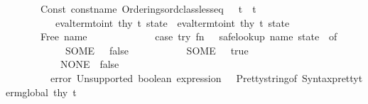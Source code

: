 \begin{isabellebody}
\ \ \ \ \ \ {\isacharbar}{\kern0pt}\ Const\ {\isacharparenleft}{\kern0pt}{\isacharat}{\kern0pt}{\isacharbraceleft}{\kern0pt}const{\isacharunderscore}{\kern0pt}name\ {\isachardoublequote}{\kern0pt}Orderings{\isachardot}{\kern0pt}ord{\isacharunderscore}{\kern0pt}class{\isachardot}{\kern0pt}less{\isacharunderscore}{\kern0pt}eq{\isachardoublequote}{\kern0pt}{\isacharbraceright}{\kern0pt}{\isacharcomma}{\kern0pt}\ {\isacharunderscore}{\kern0pt}{\isacharparenright}{\kern0pt}\ {\isachardollar}{\kern0pt}\ t{}\ {\isachardollar}{\kern0pt}\ t{}\ {\isacharequal}{\kern0pt}{\isachargreater}{\kern0pt}\isanewline
\ \ \ \ \ \ \ \ \ \ {\isacharparenleft}{\kern0pt}eval{\isacharunderscore}{\kern0pt}term{\isacharunderscore}{\kern0pt}to{\isacharunderscore}{\kern0pt}int\ thy\ t{}\ state{\isacharparenright}{\kern0pt}\ {\isacharless}{\kern0pt}{\isacharequal}{\kern0pt}\ {\isacharparenleft}{\kern0pt}eval{\isacharunderscore}{\kern0pt}term{\isacharunderscore}{\kern0pt}to{\isacharunderscore}{\kern0pt}int\ thy\ t{}\ state{\isacharparenright}{\kern0pt}\isanewline
\ \ \ \ \ \ {\isacharbar}{\kern0pt}\ Free\ {\isacharparenleft}{\kern0pt}name{\isacharcomma}{\kern0pt}\ {\isacharunderscore}{\kern0pt}{\isacharparenright}{\kern0pt}\ {\isacharequal}{\kern0pt}{\isachargreater}{\kern0pt}\ \isanewline
\ \ \ \ \ \ \ \ \ \ {\isacharparenleft}{\kern0pt}case\ try\ {\isacharparenleft}{\kern0pt}fn\ {\isacharparenleft}{\kern0pt}{\isacharparenright}{\kern0pt}\ {\isacharequal}{\kern0pt}{\isachargreater}{\kern0pt}\ safe{\isacharunderscore}{\kern0pt}lookup\ name\ state{\isacharparenright}{\kern0pt}\ {\isacharparenleft}{\kern0pt}{\isacharparenright}{\kern0pt}\ of\isanewline
\ \ \ \ \ \ \ \ \ \ \ \ SOME\ {}\ {\isacharequal}{\kern0pt}{\isachargreater}{\kern0pt}\ false\isanewline
\ \ \ \ \ \ \ \ \ \ {\isacharbar}{\kern0pt}\ SOME\ {\isacharunderscore}{\kern0pt}\ {\isacharequal}{\kern0pt}{\isachargreater}{\kern0pt}\ true\isanewline
\ \ \ \ \ \ \ \ \ \ {\isacharbar}{\kern0pt}\ NONE\ {\isacharequal}{\kern0pt}{\isachargreater}{\kern0pt}\ false{\isacharparenright}{\kern0pt}\isanewline
\ \ \ \ \ \ {\isacharbar}{\kern0pt}\ {\isacharunderscore}{\kern0pt}\ {\isacharequal}{\kern0pt}{\isachargreater}{\kern0pt}\ error\ {\isacharparenleft}{\kern0pt}{\isachardoublequote}{\kern0pt}Unsupported\ boolean\ expression{\isacharcolon}{\kern0pt}\ {\isachardoublequote}{\kern0pt}\ {\isacharcircum}{\kern0pt}\ Pretty{\isachardot}{\kern0pt}string{\isacharunderscore}{\kern0pt}of\ {\isacharparenleft}{\kern0pt}Syntax{\isachardot}{\kern0pt}pretty{\isacharunderscore}{\kern0pt}term{\isacharunderscore}{\kern0pt}global\ thy\ t{\isacharparenright}{\kern0pt}\ {\isacharparenright}{\kern0pt}\isanewline

\end{isabellebody}
